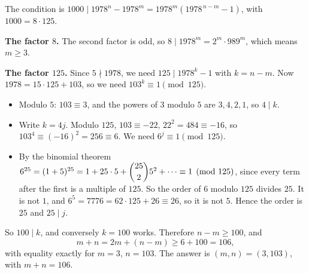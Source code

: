 The condition is $1000\mid1978^n-1978^m=1978^m\left(1978^{\,n-m}-1\right)$, with $1000=8\cdot125$.

\textbf{The factor $8$.} The second factor is odd, so $8\mid1978^m=2^m\cdot989^m$, which means $m\ge3$.

\textbf{The factor $125$.} Since $5\nmid1978$, we need $125\mid1978^k-1$ with $k=n-m$. Now $1978=15\cdot125+103$, so we need $103^k\equiv1\pmod{125}$.
\begin{itemize}
\item Modulo $5$: $103\equiv3$, and the powers of $3$ modulo $5$ are $3,4,2,1$, so $4\mid k$.
\item Write $k=4j$. Modulo $125$, $103\equiv-22$, $22^2=484\equiv-16$, so $103^4\equiv(-16)^2=256\equiv6$. We need $6^j\equiv1\pmod{125}$.
\item By the binomial theorem $6^{25}=(1+5)^{25}=1+25\cdot5+\dbinom{25}{2}5^2+\cdots\equiv1\pmod{125}$, since every term after the first is a multiple of $125$. So the order of $6$ modulo $125$ divides $25$. It is not $1$, and $6^5=7776=62\cdot125+26\equiv26$, so it is not $5$. Hence the order is $25$ and $25\mid j$.
\end{itemize}
So $100\mid k$, and conversely $k=100$ works. Therefore $n-m\ge100$, and
\[
m+n=2m+(n-m)\ge6+100=106,
\]
with equality exactly for $m=3$, $n=103$. The answer is $\boxed{(m,n)=(3,103)}$, with $m+n=106$.
